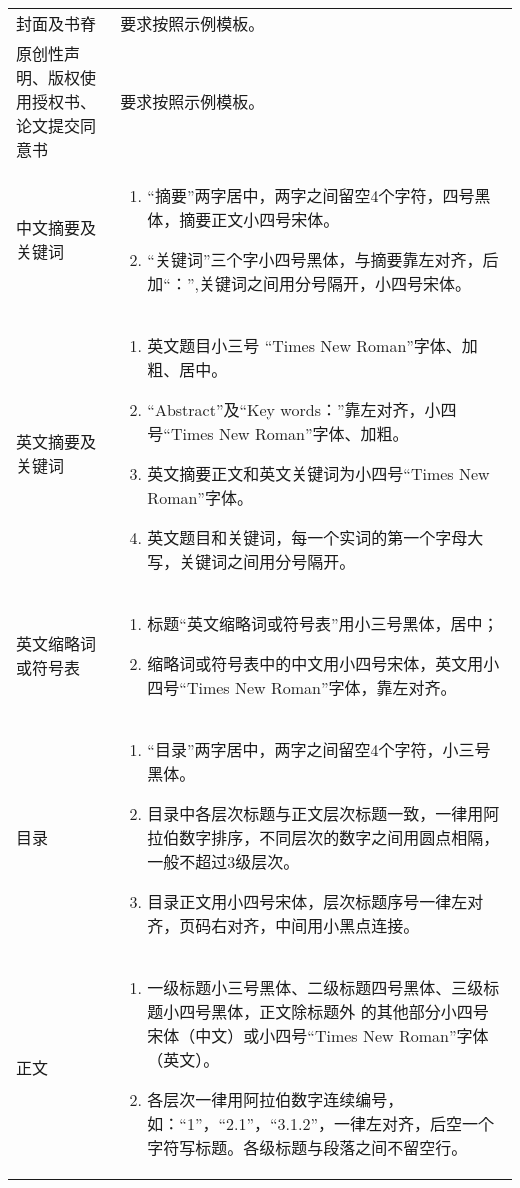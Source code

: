 \begin{center}
\begin{longtable}{m{5cm}m{9cm}}
    封面及书脊 & 要求按照示例模板。\\
    原创性声明、版权使用授权书、论文提交同意书 & 要求按照示例模板。\\
    中文摘要及关键词 & 
    \begin{enumerate}
      \item “摘要”两字居中，两字之间留空4个字符，四号黑体，摘要正文小四号宋体。
      \item “关键词”三个字小四号黑体，与摘要靠左对齐，后加“：”,关键词之间用分号隔开，小四号宋体。
    \end{enumerate}\\
    英文摘要及关键词 & 
    \begin{enumerate}
      \item 英文题目小三号 “Times New Roman”字体、加粗、居中。
      \item “Abstract”及“Key words：”靠左对齐，小四号“Times New Roman”字体、加粗。
      \item 英文摘要正文和英文关键词为小四号“Times New Roman”字体。          
      \item 英文题目和关键词，每一个实词的第一个字母大写，关键词之间用分号隔开。
    \end{enumerate}\\
    英文缩略词或符号表 & 
    \begin{enumerate}
      \item 标题“英文缩略词或符号表”用小三号黑体，居中；
      \item 缩略词或符号表中的中文用小四号宋体，英文用小四号“Times New Roman”字体，靠左对齐。
    \end{enumerate}\\
    目录 & 
    \begin{enumerate}
      \item “目录”两字居中，两字之间留空4个字符，小三号黑体。
      \item 目录中各层次标题与正文层次标题一致，一律用阿拉伯数字排序，不同层次的数字之间用圆点相隔，一般不超过3级层次。        
      \item 目录正文用小四号宋体，层次标题序号一律左对齐，页码右对齐，中间用小黑点连接。
    \end{enumerate}\\
    正文 & 
    \begin{enumerate}
      \item 一级标题小三号黑体、二级标题四号黑体、三级标题小四号黑体，正文除标题外
      的其他部分小四号宋体（中文）或小四号“Times New Roman”字体（英文）。
      \item 各层次一律用阿拉伯数字连续编号，如：“1”，“2.1”，“3.1.2”，一律左对齐，后空一个字符写标题。各级标题与段落之间不留空行。       

\end{enumerate}
\end{longtable}
\end{center}
